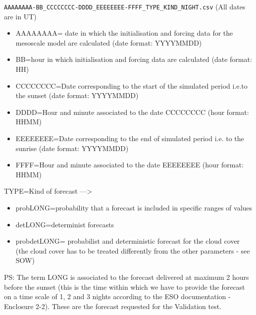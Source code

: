 \documentclass[11pt,english]{article}
\begin{document}
\verb+AAAAAAAA-BB_CCCCCCCC-DDDD_EEEEEEEE-FFFF_TYPE_KIND_NIGHT.csv+
(All dates are in UT)
\begin{itemize}
\item AAAAAAAA= date in which the initialisation and forcing data for the mesoscale model are calculated (date format: YYYYMMDD)
\item BB=hour in which initialisation and forcing data are calculated (date format: HH)
\item CCCCCCCC=Date corresponding to the start of the simulated period i.e.to the sunset (date format: YYYYMMDD)
\item DDDD=Hour and minute associated to the date CCCCCCCC (hour format: HHMM)
\item EEEEEEEE=Date corresponding to the end of simulated period i.e. to the sunrise (date format: YYYYMMDD)
\item FFFF=Hour and minute associated to the date EEEEEEEE (hour format: HHMM)
\end{itemize}

TYPE=Kind of forecast ---> 
\begin{itemize}	
\item probLONG=probability that a forecast is included in specific ranges of values
\item detLONG=determinist forecasts
\item probdetLONG= probabilist and deterministic forecast for the cloud cover (the cloud cover has to be treated differently from the other parameters - see SOW)
\end{itemize}	
%
%
PS: The term LONG is associated to the forecast delivered at maximum 2 hours before the sunset (this is the time within which we have to provide the forecast on a time scale of 1, 2 and 3 nights according to the ESO documentation - Enclosure 2-2). These are the forecast requested for the Validation test.
\end{document}

